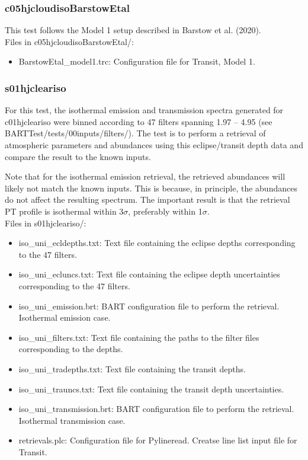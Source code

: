 \documentclass[letterpaper, 12pt]{article}
\begin{document}
\subsubsection{c05hjcloudisoBarstowEtal}
\label{sec:comp-barstow-cloud}
This test follows the Model 1 setup described in Barstow et al. (2020).\\

Files in c05hjcloudisoBarstowEtal/:
\begin{itemize} \itemsep0pt
  \item BarstowEtal{\_}model1.trc: Configuration file for Transit, Model 1.
\end{itemize}

\subsubsection{s01hjcleariso}
\label{sec:retrievals}
For this test, the isothermal emission and transmission spectra generated for 
c01hjcleariso were binned according to 47 filters spanning 
1.97 -- 4.95 \microns (see BARTTest/tests/00inputs/filters/). 
The test 
is to perform a retrieval of atmospheric parameters and abundances using this 
eclipse/transit depth data and compare the result to the known inputs.

Note that for the isothermal emission retrieval, the retrieved abundances will 
likely not match the known inputs. This is because, in principle, the 
abundances do not affect the resulting spectrum. 
The important result is that the retrieval PT profile is 
isothermal within 3$\sigma$, preferably within 1$\sigma$.\\

Files in s01hjcleariso/:
\begin{itemize} \itemsep0pt
  \item iso{\_}uni{\_}ecldepths.txt: Text file containing the eclipse 
        depths corresponding to the 47 filters.
  \item iso{\_}uni{\_}ecluncs.txt: Text file containing the eclipse depth 
        uncertainties corresponding to the 47 filters.
  \item iso{\_}uni{\_}emission.brt: BART configuration file to perform the retrieval. 
        Isothermal emission case.
  \item iso{\_}uni{\_}filters.txt: Text file containing the paths to the filter files corresponding to the depths.
  \item iso{\_}uni{\_}tradepths.txt: Text file containing the transit depths.
  \item iso{\_}uni{\_}trauncs.txt: Text file containing the transit depth 
        uncertainties. 
  \item iso{\_}uni{\_}transmission.brt: BART configuration file to perform the 
        retrieval. Isothermal transmission case.
  \item retrievals.plc: Configuration file for Pylineread. Creatse line list input file for Transit.
\end{itemize}
\end{document}
